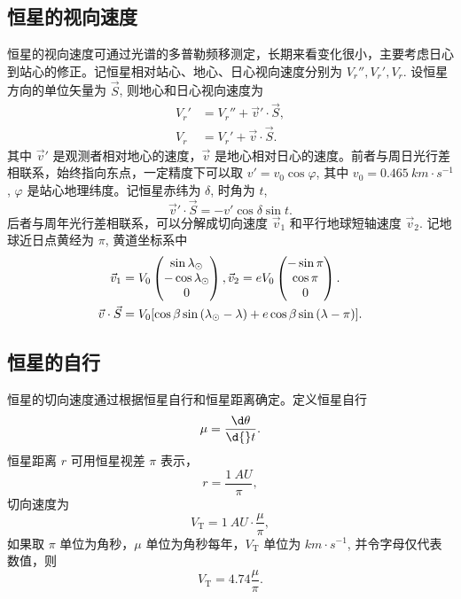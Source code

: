 \documentclass[UTF8, 12pt, a4paper, oneside, onecolumn, fontset=none]{ctexart}
\begin{document}
\subsection{恒星的视向速度}
恒星的视向速度可通过光谱的多普勒频移测定，长期来看变化很小，主要考虑日心到站心的修正。记恒星相对站心、地心、日心视向速度分别为 $V_{r}'', V_{r}', V_{r}$. 设恒星方向的单位矢量为 $\vec{S}$, 则地心和日心视向速度为
\begin{align}
V_{r}'&=V_{r}''+\vec{v}'\cdot\vec{S},\\
V_{r}&=V_{r}'+\vec{v}\cdot\vec{S}.
\end{align}
其中 $\vec{v}'$ 是观测者相对地心的速度，$\vec{v}$ 是地心相对日心的速度。前者与周日光行差相联系，始终指向东点，一定精度下可以取 $v'=v_{0}\cos{\varphi}$, 其中 $v_{0}=\qty{0.465}{km\cdot{}s^{-1}}$, $\varphi$ 是站心地理纬度。记恒星赤纬为 $\delta$, 时角为 $t$,
\begin{equation}
\vec{v}'\cdot\vec{S}=-v'\cos{\delta}\sin{t}.
\end{equation}
后者与周年光行差相联系，可以分解成切向速度 $\vec{v}_{1}$ 和平行地球短轴速度 $\vec{v}_{2}$. 记地球近日点黄经为 $\pi$, 黄道坐标系中
\begin{align}
\vec{v}_{1}&=V_{0}\begin{pmatrix}
\sin{\lambda_{\odot}}\\
-\cos{\lambda_{\odot}}\\
0
\end{pmatrix},
\vec{v}_{2}=eV_{0}\begin{pmatrix}
-\sin{\pi}\\
\cos{\pi}\\
0
\end{pmatrix}.\\
\vec{v}\cdot\vec{S}&=V_{0}\mleft[\cos{\beta}\sin{\mleft(\lambda_{\odot}-\lambda\mright)}+e\cos{\beta}\sin{\mleft(\lambda-\pi\mright)}\mright].
\end{align}

\subsection{恒星的自行}
恒星的切向速度通过根据恒星自行和恒星距离确定。定义恒星自行
\begin{equation}
\mu=\frac{\d\theta}{\d{}t}.
\end{equation}
恒星距离 $r$ 可用恒星视差 $\pi$ 表示，
\begin{equation}
r=\frac{\qty{1}{AU}}{\pi},
\end{equation}
切向速度为
\begin{equation}
V_{\mathrm{T}}=\qty{1}{AU}\cdot\frac{\mu}{\pi},
\end{equation}
如果取 $\pi$ 单位为角秒，$\mu$ 单位为角秒每年，$V_{\mathrm{T}}$ 单位为 $\unit{km\cdot{}s^{-1}}$, 并令字母仅代表数值，则
\begin{equation}
V_{\mathrm{T}}=4.74\frac{\mu}{\pi}.
\end{equation}
\end{document}
